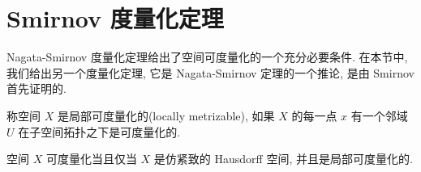 \documentclass[../../main.tex]{subfiles}
\begin{document}
\section{Smirnov 度量化定理}\label{section:ch06-smirnov-metrization}

Nagata-Smirnov 度量化定理给出了空间可度量化的一个充分必要条件. 在本节中, 我们给出另一个度量化定理, 它是 Nagata-Smirnov 定理的一个推论, 是由 Smirnov 首先证明的.

\begin{definition}\label{definition:ch06-locally-metrizable}
称空间 $X$ 是局部可度量化的(locally metrizable), 如果 $X$ 的每一点 $x$ 有一个邻域 $U$ 在子空间拓扑之下是可度量化的.
\end{definition}

\begin{theorem}\label{theorem:ch06-smirnov-metrization}
空间 $X$ 可度量化当且仅当 $X$ 是仿紧致的 Hausdorff 空间, 并且是局部可度量化的.
\end{theorem}
\end{document}
